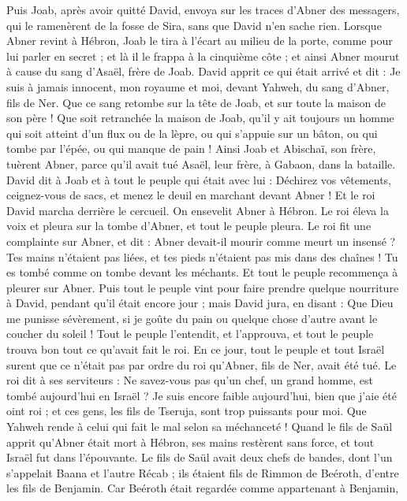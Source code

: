 \begin{multicols}{2}
Puis Joab, après avoir quitté David, envoya sur les traces d'Abner des messagers, qui le ramenèrent de la fosse de Sira, sans que David n'en sache rien.
Lorsque Abner revint à Hébron, Joab le tira à l'écart au milieu de la porte, comme pour lui parler en secret ; et là il le frappa à la cinquième côte ; et ainsi Abner mourut à cause du sang d'Asaël, frère de Joab.
David apprit ce qui était arrivé et dit : Je suis à jamais innocent, mon royaume et moi, devant Yahweh, du sang d'Abner, fils de Ner.
Que ce sang retombe sur la tête de Joab, et sur toute la maison de son père ! Que soit retranchée la maison de Joab, qu'il y ait toujours un homme qui soit atteint d'un flux ou de la lèpre, ou qui s'appuie sur un bâton, ou qui tombe par l'épée, ou qui manque de pain !
Ainsi Joab et Abischaï, son frère, tuèrent Abner, parce qu'il avait tué Asaël, leur frère, à Gabaon, dans la bataille.
David dit à Joab et à tout le peuple qui était avec lui : Déchirez vos vêtements, ceignez-vous de sacs, et menez le deuil en marchant devant Abner ! Et le roi David marcha derrière le cercueil.
On ensevelit Abner à Hébron. Le roi éleva la voix et pleura sur la tombe d'Abner, et tout le peuple pleura.
Le roi fit une complainte sur Abner, et dit : Abner devait-il mourir comme meurt un insensé ?
Tes mains n'étaient pas liées, et tes pieds n'étaient pas mis dans des chaînes ! Tu es tombé comme on tombe devant les méchants. Et tout le peuple recommença à pleurer sur Abner.
Puis tout le peuple vint pour faire prendre quelque nourriture à David, pendant qu'il était encore jour ; mais David jura, en disant : Que Dieu me punisse sévèrement, si je goûte du pain ou quelque chose d'autre avant le coucher du soleil !
Tout le peuple l'entendit, et l'approuva, et tout le peuple trouva bon tout ce qu'avait fait le roi.
En ce jour, tout le peuple et tout Israël surent que ce n'était pas par ordre du roi qu'Abner, fils de Ner, avait été tué.
Le roi dit à ses serviteurs : Ne savez-vous pas qu'un chef, un grand homme, est tombé aujourd'hui en Israël ?
Je suis encore faible aujourd'hui, bien que j'aie été oint roi ; et ces gens, les fils de Tseruja, sont trop puissants pour moi. Que Yahweh rende à celui qui fait le mal selon sa méchanceté !
\VerseOne{}Quand le fils de Saül apprit qu'Abner était mort à Hébron, ses mains restèrent sans force, et tout Israël fut dans l'épouvante.
Le fils de Saül avait deux chefs de bandes, dont l'un s'appelait Baana et l'autre Récab ; ils étaient fils de Rimmon de Beéroth, d'entre les fils de Benjamin. Car Beéroth était regardée comme appartenant à Benjamin,

\end{multicols}
